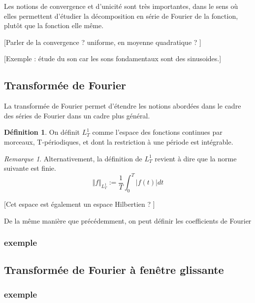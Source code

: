 \documentclass[]{article}
\theoremstyle{remark}
\newtheorem{myrem}{Remarque}
\theoremstyle{definition}
\newtheorem{mydef}{Définition}
\begin{document}
			Les notions de convergence et d'unicité sont très importantes, dans le sens où elles permettent d'étudier la décomposition en série de Fourier de la fonction, plutôt que la fonction elle même. 

			[Parler de la convergence ? uniforme, en moyenne quadratique ? ]
			
			
			[Exemple : étude du son car les sons fondamentaux sont des sinusoides.] 
			
			
			
			\subsection{Transformée de Fourier}
			La transformée de Fourier permet d'étendre les notions abordées dans le cadre des séries de Fourier dans un cadre plus général. 
			
			\begin{mydef}
				On définit $L^1_T$ comme l'espace des fonctions continues par morceaux, T-périodiques, et dont la restriction à une période est intégrable. 
			\end{mydef}
			
			
			\begin{myrem}
				Alternativement, la définition de $L^1_T$ revient à dire que la norme suivante est finie. $$\Vert f\Vert_{L^1_T} := \frac{1}{T}\int_{0}^{T} \vert f(t)\vert dt $$
			\end{myrem}
			
			[Cet espace est également un espace Hilbertien ? ]
			
			De la même manière que précédemment, on peut définir les coefficients de Fourier
			
			
			
					
	
	
	
	\subsubsection{exemple}
	
	
	\subsection{Transformée de Fourier à fenêtre glissante}
	\subsubsection{exemple}
	
\end{document}
